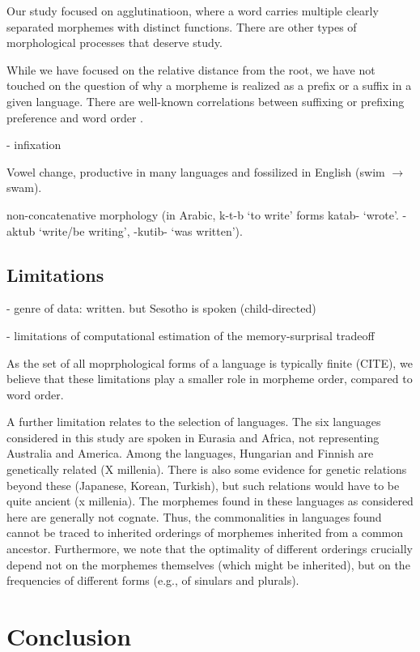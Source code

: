\documentclass[11pt,letterpaper]{article}
\begin{document}
Our study focused on agglutinatioon, where a word carries multiple clearly separated morphemes with distinct functions.
There are other types of morphological processes that deserve study.

While we have focused on the relative distance from the root, we have not touched on the question of why a morpheme is realized as a prefix or a suffix in a given language.
There are well-known correlations between suffixing or prefixing preference and word order \citep{greenberg1963universals}.

- infixation

Vowel change, productive in many languages and fossilized in English (swim $\rightarrow$ swam).

non-concatenative morphology (in Arabic, k-t-b `to write' forms katab- `wrote'. -aktub `write/be writing', -kutib- `was written').

\subsection{Limitations}

- genre of data: written. but Sesotho is spoken (child-directed)


- limitations of computational estimation of the memory-surprisal tradeoff

As the set of all moprphological forms of a language is typically finite (CITE), we believe that these limitations play a smaller role in morpheme order, compared to word order.


A further limitation relates to the selection of languages.
The six languages considered in this study are spoken in Eurasia and Africa, not representing Australia and America.
Among the languages, Hungarian and Finnish are genetically related (X millenia).
There is also some evidence for genetic relations beyond these (Japanese, Korean, Turkish), but such relations would have to be quite ancient (x millenia).
The morphemes found in these languages as considered here are generally not cognate.
Thus, the commonalities in languages found cannot be traced to inherited orderings of morphemes inherited from a common ancestor.
Furthermore, we note that the optimality of different orderings crucially depend not on the morphemes themselves (which might be inherited), but on the frequencies of different forms (e.g., of sinulars and plurals).



\section{Conclusion}
\end{document}
